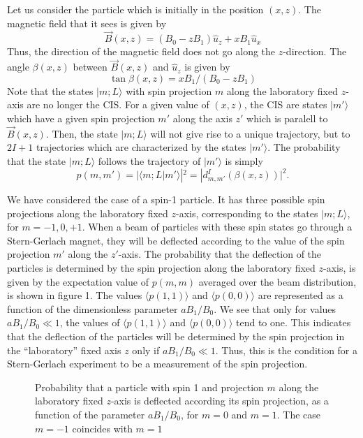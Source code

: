\documentclass[aps,preprint,prl]{revtex4-2}
\newcommand{\be}{\begin{equation}}
\newcommand{\ee}{\end{equation}}
\begin{document}
Let us consider the particle which is initially  in the position $(x,z)$. 
The magnetic field that it sees is given by
\be
\vec B(x,z) = (B_0 - z B_1) \hat u_z + x B_1 \hat u_x
\ee
Thus, the direction of the magnetic field does not go along the $z$-direction.
The angle $\beta(x,z)$ between $\vec B(x,z)$ and $\hat u_z$ is given by
\be 
\tan \beta (x,z) =  x B_1 /(B_0 - z B_1)
\ee
Note that the states  $|m;L \rangle$ with spin projection $m$ along the 
laboratory fixed 
$z$-axis are no longer
the CIS. For a given value of $(x,z)$, the CIS are states $|m' \rangle$ which have
a given spin projection $m'$ along the axis $z'$ which is paralell to  
$\vec B(x,z)$. Then, the state $|m;L \rangle$ will not give rise to a unique 
trajectory,
but to $2I+1$ trajectories which are characterized by the states
$|m' \rangle$. The probability that the state $|m;L \rangle$ follows the trajectory of 
$|m' \rangle$ is simply  
\be
p(m,m') = |\langle m;L|m' \rangle|^2 = |d^I_{m,m'}(\beta(x,z))|^2.
\ee

We have considered the case of a spin-1 particle. It has three possible spin
projections along the laboratory fixed $z$-axis, corresponding to the states
$|m;L \rangle$, for $m=-1,0,+1$. When a beam of particles with these spin states
go through a Stern-Gerlach magnet, they will be deflected according to the
value of the spin projection $m'$ along the $z'$-axis. The probability that
the deflection of the particles is determined by the spin projection along
the laboratory fixed $z$-axis, is given by 
the expectation value of $p(m,m)$ averaged over the beam distribution,
is shown in figure 1. The values $\langle p(1,1) \rangle$ and $\langle p(0,0) \rangle$ are represented
as a function of the dimensionless parameter $aB_1/B_0$. We see that only 
for values $aB_1/B_0 \ll 1$, the values of $\langle p(1,1) \rangle$ and $\langle p(0,0) \rangle$ 
tend to one. This indicates that the deflection of the particles will be 
determined by the spin projection in the ``laboratory'' fixed axis $z$ only
if  $aB_1/B_0 \ll 1$. Thus, this is the condition for a Stern-Gerlach 
experiment to be a measurement of the spin projection.

\begin{center}
\begin{figure}[hbt]
\mbox{}
\vspace{1cm}
\caption{Probability that a particle with spin 1 and projection $m$ along
the laboratory fixed $z$-axis is deflected according its spin projection, 
as a function of the 
parameter $aB_1/B_0$, for $m=0$ and $m=1$. The case $m=-1$ coincides with 
$m=1$}  
\end{figure}
\end{center}
\end{document}
